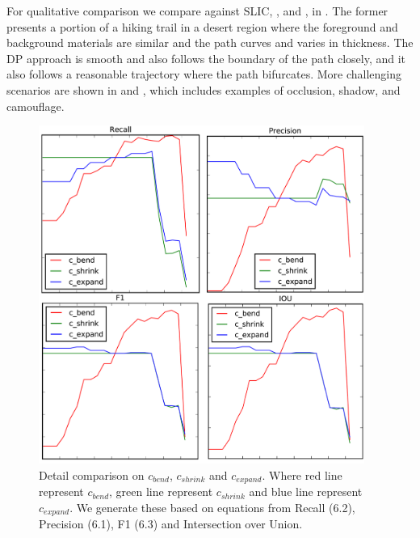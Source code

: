 For qualitative comparison we compare against \ac{SLIC}, \ActiveContours{}, and \GrabCut{}, in
. The former presents a portion of a hiking trail in a desert region where the foreground and background materials are similar and the path curves and varies in thickness. The \ac{DP} approach is smooth and also follows the boundary of the path closely, and it also follows a reasonable trajectory where the path bifurcates. More challenging scenarios are shown in  and , which includes examples of occlusion, shadow, and camouflage.  

\begin{figure}[H]
    \centering
    \includegraphics[width=0.95\textwidth]{Figures/changes_on_recall.png}
    \caption[Parameters Evaluation]{Detail comparison on $c_{bend}$, $c_{shrink}$ and $c_{expand}$. Where red line represent $c_{bend}$, green line represent $c_{shrink}$ and blue line represent $c_{expand}$. We generate these based on equations from Recall (6.2), Precision (6.1), F1 (6.3) and Intersection over Union.}
    \label{fig:change_on_recall}
\end{figure}

